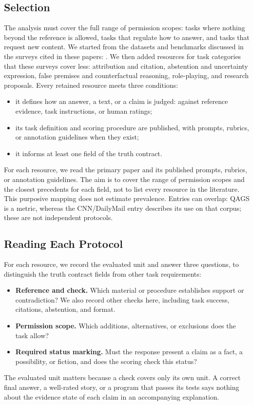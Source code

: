 \documentclass{clv2025}
\begin{document}
\subsection{Selection}\label{subsec:selection}

The analysis must cover the full range of permission scopes: tasks where
nothing beyond the reference is allowed, tasks that regulate how to answer,
and tasks that request new content. We started from the datasets and
benchmarks discussed in the surveys cited in these papers:
\citep{ji_survey_2023,huang_survey_2025,jiang_survey_2024,
franceschelli_creativity_2024}. We then added resources for task
categories that these surveys cover less: attribution and citation,
abstention and uncertainty expression, false premises and counterfactual
reasoning, role-playing, and research proposals. Every retained resource
meets three conditions:
\begin{itemize}
\item it defines how an answer, a text, or a claim is judged: against
reference evidence, task instructions, or human ratings;
\item its task definition and scoring procedure are published, with
prompts, rubrics, or annotation guidelines when they exist;
\item it informs at least one field of the truth contract.
\end{itemize}
For each resource, we read the primary paper and its published prompts,
rubrics, or annotation guidelines. The aim is to cover the range of
permission scopes and the closest precedents for each field, not to list
every resource in the literature. This purposive mapping does not estimate
prevalence. Entries can overlap: QAGS is a metric, whereas the CNN/DailyMail
entry describes its use on that corpus; these are not independent protocols.

\subsection{Reading Each Protocol}\label{subsec:criteria}

For each resource, we record the evaluated unit and answer three questions,
to distinguish the truth contract fields from other task requirements:
\begin{itemize}
\item \textbf{Reference and check.} Which material or procedure establishes
support or contradiction? We also record other checks here, including
task success, citations, abstention, and format.
\item \textbf{Permission scope.} Which additions, alternatives, or
exclusions does the task allow?
\item \textbf{Required status marking.} Must the response present a claim
as a fact, a possibility, or fiction, and does the scoring check this status?
\end{itemize}
The evaluated unit matters because a check covers only its own unit.
A correct final answer, a well-rated story, or a program that passes its
tests says nothing about the evidence state of each claim in an
accompanying explanation.
\end{document}
